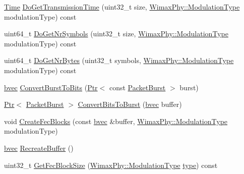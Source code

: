 \begin{DoxyCompactItemize}
\item 
\hyperlink{classns3_1_1Time}{Time} \hyperlink{classns3_1_1SimpleOfdmWimaxPhy_a5919310699b32746da514d22182154cf}{Do\+Get\+Transmission\+Time} (uint32\+\_\+t size, \hyperlink{classns3_1_1WimaxPhy_a044c5d8a48ca992c39c2a946f6e755fa}{Wimax\+Phy\+::\+Modulation\+Type} modulation\+Type) const 
\item 
uint64\+\_\+t \hyperlink{classns3_1_1SimpleOfdmWimaxPhy_ae7f9f0d7f2c8d8bac11e7b6937c9a1d2}{Do\+Get\+Nr\+Symbols} (uint32\+\_\+t size, \hyperlink{classns3_1_1WimaxPhy_a044c5d8a48ca992c39c2a946f6e755fa}{Wimax\+Phy\+::\+Modulation\+Type} modulation\+Type) const 
\item 
uint64\+\_\+t \hyperlink{classns3_1_1SimpleOfdmWimaxPhy_a029e476e43c0be019ca791f8ed74a58d}{Do\+Get\+Nr\+Bytes} (uint32\+\_\+t symbols, \hyperlink{classns3_1_1WimaxPhy_a044c5d8a48ca992c39c2a946f6e755fa}{Wimax\+Phy\+::\+Modulation\+Type} modulation\+Type) const 
\item 
\hyperlink{namespacens3_a184f2682613716e1a24969b3e70b4242}{bvec} \hyperlink{classns3_1_1SimpleOfdmWimaxPhy_a720115cc699522cc4d1916b54f8fe743}{Convert\+Burst\+To\+Bits} (\hyperlink{classns3_1_1Ptr}{Ptr}$<$ const \hyperlink{classns3_1_1PacketBurst}{Packet\+Burst} $>$ burst)
\item 
\hyperlink{classns3_1_1Ptr}{Ptr}$<$ \hyperlink{classns3_1_1PacketBurst}{Packet\+Burst} $>$ \hyperlink{classns3_1_1SimpleOfdmWimaxPhy_acb3209dedb242afc884ebdb5ee178350}{Convert\+Bits\+To\+Burst} (\hyperlink{namespacens3_a184f2682613716e1a24969b3e70b4242}{bvec} buffer)
\item 
void \hyperlink{classns3_1_1SimpleOfdmWimaxPhy_aea701effa3928e4fcaab11a32182b1aa}{Create\+Fec\+Blocks} (const \hyperlink{namespacens3_a184f2682613716e1a24969b3e70b4242}{bvec} \&buffer, \hyperlink{classns3_1_1WimaxPhy_a044c5d8a48ca992c39c2a946f6e755fa}{Wimax\+Phy\+::\+Modulation\+Type} modulation\+Type)
\item 
\hyperlink{namespacens3_a184f2682613716e1a24969b3e70b4242}{bvec} \hyperlink{classns3_1_1SimpleOfdmWimaxPhy_ad25a1cd651b71ae23398eb7497784e5a}{Recreate\+Buffer} ()
\item 
uint32\+\_\+t \hyperlink{classns3_1_1SimpleOfdmWimaxPhy_a3c5f13095e4d8bf83749179e4febcd6e}{Get\+Fec\+Block\+Size} (\hyperlink{classns3_1_1WimaxPhy_a044c5d8a48ca992c39c2a946f6e755fa}{Wimax\+Phy\+::\+Modulation\+Type} \hyperlink{visualizer-ideas_8txt_add98db9e15e2a58cf2b57623e7aa893a}{type}) const 
\item 

\end{DoxyCompactItemize}

